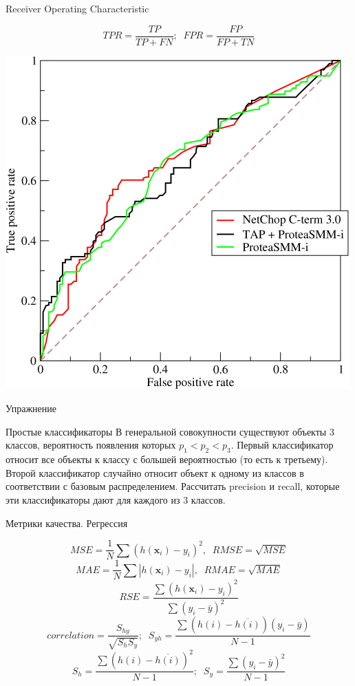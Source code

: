 \documentclass[10pt]{beamer}
\begin{document}
\begin{frame}{Receiver Operating Characteristic}

\[
TPR = \frac{TP}{TP + FN};\;\;FPR = \frac{FP}{FP + TN}
\]

\begin{center}
\includegraphics[scale=2.0]{images/roc.png}
\end{center}

\end{frame}

\begin{frame}{Упражнение}

\begin{exampleblock}{Простые классификаторы}
В генеральной совокупности существуют объекты 3 классов, вероятность появления которых $p_1 < p_2 < p_3$. Первый классификатор относит все объекты к классу с большей вероятностью (то есть к третьему). Второй классификатор случайно относит объект к одному из классов в соответствии с базовым распределением. Рассчитать precision и recall, которые эти классификаторы дают для каждого из 3 классов.
\end{exampleblock}

\end{frame}

\begin{frame}{Метрики качества. Регрессия}

\[
MSE = \frac 1 N \sum (h(\mathbf{x}_i) - y_i)^2, \;\; RMSE = \sqrt{MSE}
\]
\[
MAE =  \frac 1 N \sum |h(\mathbf{x}_i) - y_i|, \;\; RMAE = \sqrt{MAE}
\]
\[
RSE =  \frac{\sum (h(\mathbf{x}_i) - y_i)^2}{\sum (y_i - \bar{y})^2}
\]
\[
correlation = \frac{S_{hy}}{\sqrt{S_h S_y}};\;\; S_{yh} = \frac{\sum(h(i)-\overline{h(i)})(y_i - \bar y)}{N-1}
\]
\[
S_{h} = \frac{\sum(h(i)-\overline{h(i)})^2}{N-1};\;\;S_{y} = \frac{\sum(y_i - \bar y)^2}{N-1}
\]

\end{frame}
\end{document}
